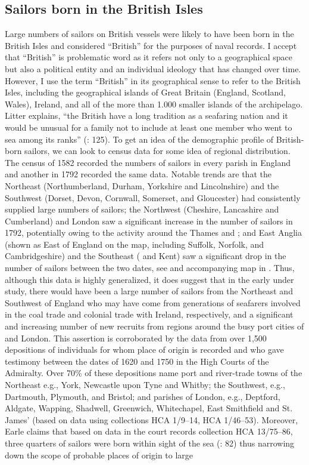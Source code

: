 \subsection{{Sailors born in the British Isles} }\label{sec:3.9.2}


Large numbers of sailors on British vessels were likely to have been born in the British Isles and considered “British” for the purposes of naval records. I accept that “British” is problematic word as it refers not only to a geographical space but also a political entity and an individual ideology that has changed over time. However, I use the term “British” in its geographical sense to refer to the British Isles, including the geographical islands of Great Britain (England, Scotland, Wales), Ireland, and all of the more than 1.000 smaller islands of the archipelago. Litter explains, “the British have a long tradition as a seafaring nation and it would be unusual for a family not to include at least one member who went to sea among its ranks” (\citeyear*{Litter1999}: 125). To get an idea of the demographic profile of British-born sailors, we can look to census data for some idea of regional distribution. The census of 1582 recorded the numbers of sailors in every parish in England \citep[246]{Bicheno2012} and another in 1792 recorded the same data. Notable trends are that the Northeast (Northumberland, Durham, Yorkshire and Lincolnshire) and the Southwest (Dorset, Devon, Cornwall, Somerset, and Gloucester) had consistently supplied large numbers of sailors; the Northwest (Cheshire, Lancashire and Cumberland) and London saw a significant increase in the number of sailors in 1792, potentially owing to the activity around the Thames and ; and East Anglia (shown as East of England on the map, including Suffolk, Norfolk, and Cambridgeshire) and the Southeast ( and Kent) saw a significant drop in the number of sailors between the two dates, see  and accompanying map in . Thus, although this data is highly generalized, it does suggest that in the early  under study, there would have been a large number of sailors from the Northeast and Southwest of England who may have come from generations of seafarers involved in the coal trade and colonial trade with Ireland, respectively, and a significant and increasing number of new recruits from regions around the busy port cities of  and London. This assertion is corroborated by the data from over 1,500 depositions of individuals for whom place of origin is recorded and who gave testimony between the dates of 1620 and 1750 in the High Courts of the Admiralty. Over 70\% of these depositions name port and river-trade towns of the Northeast e.g., York, Newcastle upon Tyne and Whitby; the Southwest, e.g., Dartmouth, Plymouth, and Bristol; and parishes of London, e.g., Deptford, Aldgate, Wapping, Shadwell, Greenwich, Whitechapel, East Smithfield and St. James’ (based on  data using collections HCA 1/9–14, HCA 1/46–53). Moreover, Earle claims that based on data in the court records collection HCA 13/75–86, three quarters of sailors were born within sight of the sea (\citeyear*{Earle1993}: 82) thus narrowing down the scope of probable places of origin to large 